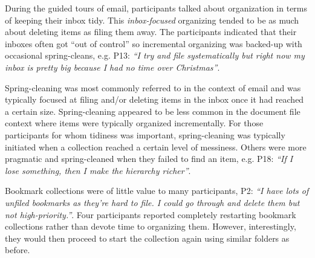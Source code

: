During the guided tours of email, participants talked about organization in terms of keeping their inbox tidy.  This \textit{inbox-focused} organizing tended to be as much about deleting items as filing them away.  The participants indicated that their inboxes often got ``out of control'' so incremental organizing was backed-up with occasional spring-cleans, e.g. P13: \textit{``I try and file systematically but right now my inbox is pretty big because I had no time over Christmas''}.




Spring-cleaning was most commonly referred to in the context of email and was typically focused at filing and/or deleting items in the inbox once it had reached a certain size.  Spring-cleaning appeared to be less common in the document file context where items were typically organized incrementally. For those participants for whom tidiness was important, spring-cleaning was typically initiated when a collection reached a certain level of messiness.  Others were more pragmatic and spring-cleaned when they failed to find an item, e.g. P18: \textit{``If I lose something, then I make the hierarchy richer''}.

Bookmark collections were of little value to many participants, P2: \textit{``I have lots of unfiled bookmarks as they're hard to file. I could go through and delete them but not high-priority.''}. Four participants reported completely restarting bookmark collections rather than devote time to organizing them. However,  interestingly, they would then proceed to start the collection again using similar folders as before. %

